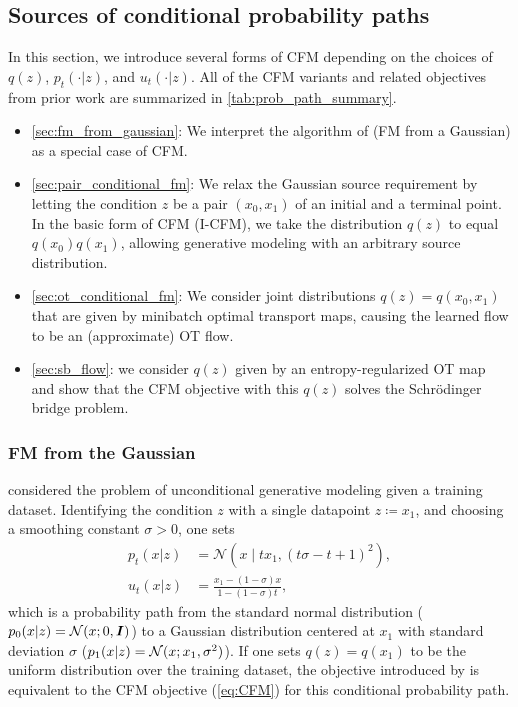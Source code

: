 \documentclass[10pt]{article}
\theoremstyle{plain}
\theoremstyle{definition}
\theoremstyle{remark}
\begin{document}
\subsection{Sources of conditional probability paths}\label{sec:CFM_setting}

In this section, we introduce several forms of CFM depending on the choices of $q(z)$, $p_t(\cdot | z)$, and $u_t(\cdot | z)$. All of the CFM variants and related objectives from prior work are summarized in \autoref{tab:prob_path_summary}.
\begin{itemize}[nosep,left=0pt]
\item \autoref{sec:fm_from_gaussian}: We interpret the algorithm of \citet{lipman_flow_2022} (FM from a Gaussian) as a special case of CFM. 
\item \autoref{sec:pair_conditional_fm}: We relax the Gaussian source requirement by letting the condition $z$ be a pair $(x_0, x_1)$ of an initial and a terminal point. In the basic form of CFM (I-CFM), we take the distribution $q(z)$ to equal $q(x_0)q(x_1)$, allowing generative modeling with an arbitrary source distribution.%
\item \autoref{sec:ot_conditional_fm}: We consider joint distributions $q(z)=q(x_0,x_1)$ that are given by minibatch optimal transport maps, causing the learned flow to be an (approximate) OT flow.  
\item \autoref{sec:sb_flow}: we consider $q(z)$ given by an entropy-regularized OT map and show that the CFM objective with this $q(z)$ solves the Schr\"odinger bridge problem.
\end{itemize}

\subsubsection{FM from the Gaussian}\label{sec:fm_from_gaussian}
\citet{lipman_flow_2022} considered the problem of unconditional generative modeling given a training dataset. Identifying the condition $z$ with a single datapoint $z \coloneqq x_1$, and choosing a smoothing constant $\sigma>0$, one sets
\begin{align}\label{eq: fm_density_vectorfield}
p_t(x | z) &= \mathcal{N}(x\mid t x_1, (t \sigma - t + 1)^2), \\
u_t(x | z) &= \frac{x_1 - (1 - \sigma) x}{1 - (1 - \sigma) t},
\end{align}
which is a probability path from the standard normal distribution ($p_0(x|z)={\mathcal{N}}(x;0,{\bm{I}})$) to a Gaussian distribution centered at $x_1$ with standard deviation $\sigma$ ($p_1(x|z)={\mathcal{N}}(x;x_1,\sigma^2)$). If one sets $q(z)=q(x_1)$ to be the uniform distribution over the training dataset, the objective introduced by \citet{lipman_flow_2022} is equivalent to the CFM objective (\ref{eq:CFM}) for this conditional probability path. 
\end{document}
